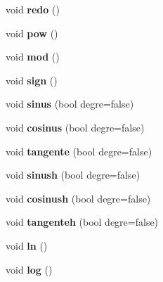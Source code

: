 \begin{DoxyCompactItemize}
\item 
\hypertarget{class_pile_aa8319a2921d86236d135cff700a5f833}{void {\bfseries redo} ()}\label{class_pile_aa8319a2921d86236d135cff700a5f833}

\item 
\hypertarget{class_pile_a20b1ece0cc61ecefc78e1a785ad8235f}{void {\bfseries pow} ()}\label{class_pile_a20b1ece0cc61ecefc78e1a785ad8235f}

\item 
\hypertarget{class_pile_a6d6092af4859ea5cefaa7959bb208774}{void {\bfseries mod} ()}\label{class_pile_a6d6092af4859ea5cefaa7959bb208774}

\item 
\hypertarget{class_pile_ad6ce16606725f1b2fa1028073afc3b75}{void {\bfseries sign} ()}\label{class_pile_ad6ce16606725f1b2fa1028073afc3b75}

\item 
\hypertarget{class_pile_a6d5405b44a45926264b48bd2df764798}{void {\bfseries sinus} (bool degre=false)}\label{class_pile_a6d5405b44a45926264b48bd2df764798}

\item 
\hypertarget{class_pile_a7962c91ddf8c1a453909150fb91608db}{void {\bfseries cosinus} (bool degre=false)}\label{class_pile_a7962c91ddf8c1a453909150fb91608db}

\item 
\hypertarget{class_pile_a45db8594e7934b5c9d749a9232afde4e}{void {\bfseries tangente} (bool degre=false)}\label{class_pile_a45db8594e7934b5c9d749a9232afde4e}

\item 
\hypertarget{class_pile_a4d12d390bd97a2432f41013ffc0dcc33}{void {\bfseries sinush} (bool degre=false)}\label{class_pile_a4d12d390bd97a2432f41013ffc0dcc33}

\item 
\hypertarget{class_pile_a44d3b913edb048c8d53d8f1f9549bfd3}{void {\bfseries cosinush} (bool degre=false)}\label{class_pile_a44d3b913edb048c8d53d8f1f9549bfd3}

\item 
\hypertarget{class_pile_a60cc5f271bbb70323af2aa0a40d40a3f}{void {\bfseries tangenteh} (bool degre=false)}\label{class_pile_a60cc5f271bbb70323af2aa0a40d40a3f}

\item 
\hypertarget{class_pile_ab22aed5e5178d32a3e47d8f4c599c9c4}{void {\bfseries ln} ()}\label{class_pile_ab22aed5e5178d32a3e47d8f4c599c9c4}

\item 
\hypertarget{class_pile_acaec5142e3afb5208091eecb6ac31f35}{void {\bfseries log} ()}\label{class_pile_acaec5142e3afb5208091eecb6ac31f35}


\end{DoxyCompactItemize}
